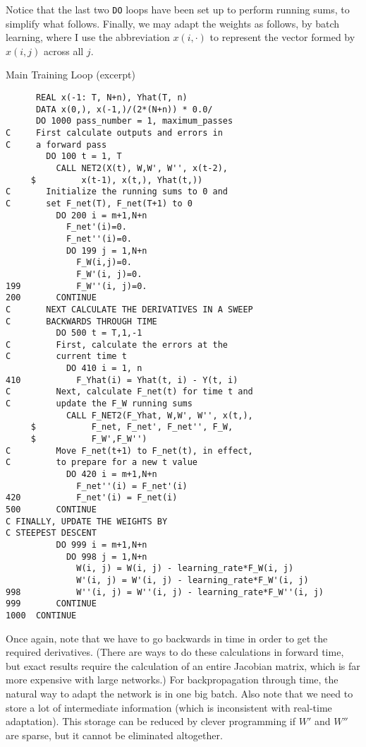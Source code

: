 \documentclass[journal]{IEEEtran} %
\begin{document}
Notice that the last two \texttt{DO} loops have been set up to perform running sums, to simplify what follows.
Finally, we may adapt the weights as follows, by batch learning, where I use the abbreviation $x(i, \cdot)$ to represent the vector formed by $x(i, j)$ across all $j$.

\begin{fortrancode}
\caption{Main Training Loop (excerpt)}
\begin{verbatim}
      REAL x(-1: T, N+n), Yhat(T, n)
      DATA x(0,), x(-1,)/(2*(N+n)) * 0.0/
      DO 1000 pass_number = 1, maximum_passes
C     First calculate outputs and errors in
C     a forward pass
        DO 100 t = 1, T
          CALL NET2(X(t), W,W', W'', x(t-2),
     $         x(t-1), x(t,), Yhat(t,))
C       Initialize the running sums to 0 and
C       set F_net(T), F_net(T+1) to 0
          DO 200 i = m+1,N+n
            F_net'(i)=0.
            F_net''(i)=0.
            DO 199 j = 1,N+n
              F_W(i,j)=0.
              F_W'(i, j)=0.
199           F_W''(i, j)=0.
200       CONTINUE
C       NEXT CALCULATE THE DERIVATIVES IN A SWEEP
C       BACKWARDS THROUGH TIME
          DO 500 t = T,1,-1
C         First, calculate the errors at the
C         current time t
            DO 410 i = 1, n
410           F_Yhat(i) = Yhat(t, i) - Y(t, i)
C         Next, calculate F_net(t) for time t and
C         update the F_W running sums
            CALL F_NET2(F_Yhat, W,W', W'', x(t,),
     $           F_net, F_net', F_net'', F_W,
     $           F_W',F_W'')
C         Move F_net(t+1) to F_net(t), in effect,
C         to prepare for a new t value
            DO 420 i = m+1,N+n
              F_net''(i) = F_net'(i)
420           F_net'(i) = F_net(i)
500       CONTINUE
C FINALLY, UPDATE THE WEIGHTS BY
C STEEPEST DESCENT
          DO 999 i = m+1,N+n
            DO 998 j = 1,N+n
              W(i, j) = W(i, j) - learning_rate*F_W(i, j)
              W'(i, j) = W'(i, j) - learning_rate*F_W'(i, j)
998           W''(i, j) = W''(i, j) - learning_rate*F_W''(i, j)
999       CONTINUE
1000  CONTINUE
\end{verbatim}
\end{fortrancode}

Once again, note that we have to go backwards in time in order to get the required derivatives. (There are ways to do these calculations in forward time, but exact results require the calculation of an entire Jacobian matrix, which is far more expensive with large networks.) For backpropagation through time, the natural way to adapt the network is in one big batch. Also note that we need to store a lot of intermediate information (which is inconsistent with real-time adaptation). This storage can be reduced by clever programming if $W'$ and $W''$ are sparse, but it cannot be eliminated altogether.
\end{document}
